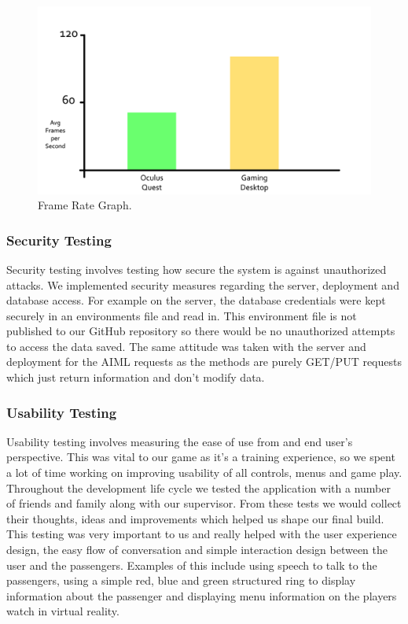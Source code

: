 \begin{figure}[h!]
	\caption{Frame Rate Graph.}
	\label{image:graph1}
	\centering
	\includegraphics[width=1\textwidth]{Images/framerate.png}
\end{figure}
\clearpage

\subsubsection{Security Testing}
Security testing involves testing how secure the system is against unauthorized attacks. We implemented security measures regarding the server, deployment and database access. For example on the server, the database credentials were kept securely in an environments file and read in. This environment file is not published to our GitHub repository so there would be no unauthorized attempts to access the data saved. The same attitude was taken with the server and deployment for the AIML requests as the methods are purely GET/PUT requests which just return information and don't modify data.

\subsubsection{Usability Testing}
Usability testing involves measuring the ease of use from and end user’s perspective. This was vital to our game as it's a training experience, so we spent a lot of time working on improving usability of all controls, menus and game play. Throughout the development life cycle we tested the application with a number of friends and family along with our supervisor. From these tests we would collect their thoughts, ideas and improvements which helped us shape our final build. This testing was very important to us and really helped with the user experience design, the easy flow of conversation and simple interaction design between the user and the passengers. Examples of this include using speech to talk to the passengers, using a simple red, blue and green structured ring to display information about the passenger and displaying menu information on the players watch in virtual reality.

